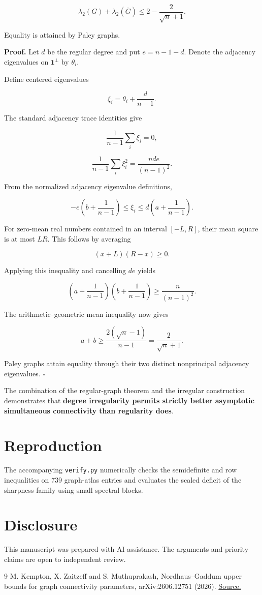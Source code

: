 \documentclass[11pt]{article}
\begin{document}
\[
\boxed{
\lambda_2(G)+\lambda_2(\overline G)
\leq 2-\frac{2}{\sqrt n+1}.
}
\]

Equality is attained by Paley graphs.

\textbf{Proof.} Let \(d\) be the regular degree and put \(e=n-1-d\). Denote the adjacency eigenvalues on \(\mathbf1^\perp\) by \(\theta_i\).

Define centered eigenvalues

\[
\xi_i=\theta_i+\frac{d}{n-1}.
\]

The standard adjacency trace identities give

\[
\frac1{n-1}\sum_i\xi_i=0,
\]

\[
\frac1{n-1}\sum_i\xi_i^2
=\frac{nde}{(n-1)^2}.
\]

From the normalized adjacency eigenvalue definitions,

\[
-e\left(b+\frac1{n-1}\right)
\leq\xi_i\leq
d\left(a+\frac1{n-1}\right).
\]

For zero-mean real numbers contained in an interval \([-L,R]\), their mean square is at most \(LR\). This follows by averaging

\[
(x+L)(R-x)\geq0.
\]

Applying this inequality and cancelling \(de\) yields

\[
\left(a+\frac1{n-1}\right)
\left(b+\frac1{n-1}\right)
\geq\frac{n}{(n-1)^2}.
\]

The arithmetic--geometric mean inequality now gives

\[
a+b\geq
\frac{2(\sqrt n-1)}{n-1}
=\frac2{\sqrt n+1}.
\]

Paley graphs attain equality through their two distinct nonprincipal adjacency eigenvalues. \(\square\)

The combination of the regular-graph theorem and the irregular construction demonstrates that \textbf{degree irregularity permits strictly better asymptotic simultaneous connectivity than regularity does}.

\section{Reproduction}
The accompanying \texttt{verify.py} numerically checks the semidefinite and row inequalities on 739 graph-atlas entries and evaluates the scaled deficit of the sharpness family using small spectral blocks.

\section*{Disclosure}
This manuscript was prepared with AI assistance. The arguments and priority claims are open to independent review.

\begin{thebibliography}{9}
 M. Kempton, X. Zaitzeff and S. Muthuprakash, Nordhaus--Gaddum upper bounds for graph connectivity parameters, arXiv:2606.12751 (2026). \href{https://arxiv.org/abs/2606.12751}{Source.}
\end{thebibliography}
\end{document}
